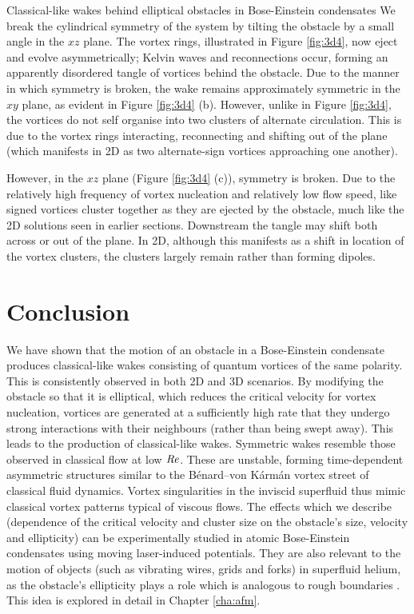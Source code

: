 \begin{chapter}{\label{cha:wake}Classical-like wakes behind elliptical obstacles in Bose-Einstein condensates}
We break the cylindrical symmetry of the system by tilting the obstacle by a small angle in the $xz$ plane.  The vortex rings, illustrated in Figure \ref{fig:3d4}, now eject and evolve asymmetrically; Kelvin waves and reconnections occur, forming an apparently disordered tangle of vortices behind the obstacle.  Due to the manner in which symmetry is broken, the wake remains approximately symmetric in the $xy$ plane, as evident in Figure \ref{fig:3d4} (b).  However, unlike in Figure \ref{fig:3d4}, the vortices do not self organise into two clusters of alternate circulation. This is due to the vortex rings interacting, reconnecting and shifting out of the plane (which manifests in 2D as two alternate-sign vortices approaching one another).



However, in the $xz$ plane (Figure \ref{fig:3d4} (c)), symmetry is broken. Due to the relatively high frequency of vortex nucleation and relatively low flow speed, like signed vortices cluster together as they are ejected by the obstacle, much like the 2D solutions seen in earlier sections.  Downstream the tangle may shift both across or out of the plane. In 2D, although this manifests as a shift in location of the vortex clusters, the clusters largely remain rather than forming dipoles. 

\section{Conclusion}
We have shown that the motion of an obstacle in a Bose-Einstein condensate produces classical-like wakes consisting of quantum vortices of the same polarity.  This is consistently observed in both 2D and 3D scenarios.  By modifying the obstacle so that it is elliptical, which reduces the critical velocity for vortex nucleation, vortices are generated at a sufficiently high rate that they undergo strong interactions with their neighbours  (rather than being swept away). This leads to the production of classical-like wakes. Symmetric wakes resemble those observed in classical flow at low $\mbox{\ensuremath{\mathit{Re}}}$.  These are unstable, forming time-dependent asymmetric structures similar to the B\'enard--von K\'arm\'an vortex street of classical fluid dynamics. Vortex singularities
in the inviscid superfluid thus mimic classical vortex patterns typical of viscous flows.  The effects which we describe (dependence of the critical velocity and cluster size on the obstacle's size, velocity and ellipticity) can be experimentally studied in atomic Bose-Einstein condensates using moving laser-induced potentials. They are also relevant to the motion of objects (such as vibrating wires, grids and forks) in superfluid helium, as the obstacle's ellipticity plays a role which is analogous to rough boundaries \cite{blaz08,brad05}. This idea is explored in detail in Chapter \ref{cha:afm}.



\end{chapter}
